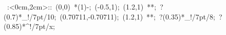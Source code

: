 %


\hbox{
\xy    <2cm,0cm>:<0cm,2cm>::
       (0,0) *\ellipse(1){-}; 
       (-0.5,1); (1.2,1) **\dir{-}; ?(0.7)*_!/7pt/{10};
       (0.70711,-0.70711); (1.2,1) **\dir{-}; ?(0.35)*_!/7pt/{8}; ?(0.85)*^!/7pt/{x};
\endxy}

